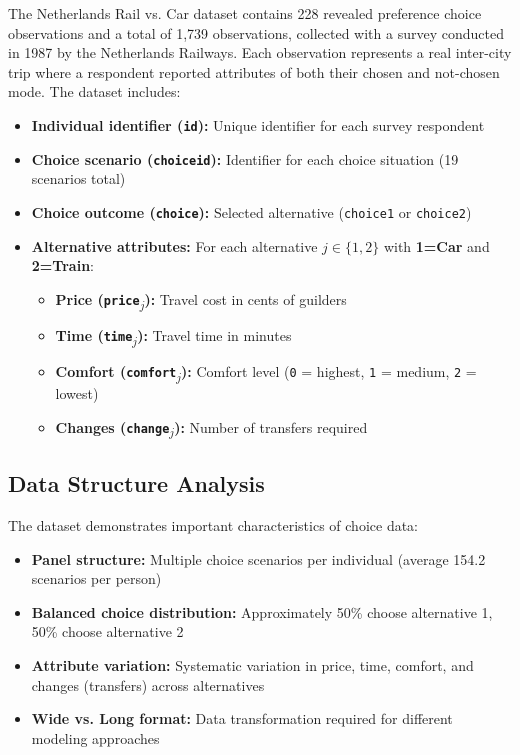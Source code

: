 \documentclass[11pt]{article}
\begin{document}
The Netherlands Rail vs. Car dataset contains 228 revealed preference choice observations and a total of 1,739 observations, collected with a survey conducted in 1987 by the Netherlands Railways. Each observation represents a real inter-city trip where a respondent reported attributes of both their chosen and not-chosen mode. The dataset includes:

\begin{itemize}
\item \textbf{Individual identifier (\texttt{id}):} Unique identifier for each survey respondent
\item \textbf{Choice scenario (\texttt{choiceid}):} Identifier for each choice situation (19 scenarios total)
\item \textbf{Choice outcome (\texttt{choice}):} Selected alternative (\texttt{choice1} or \texttt{choice2})
\item \textbf{Alternative attributes:} For each alternative $j \in \{1,2\}$ with \textbf{1=Car} and \textbf{2=Train}:
\begin{itemize}
\item \textbf{Price (\texttt{price}\textsubscript{$j$}):} Travel cost in cents of guilders
\item \textbf{Time (\texttt{time}\textsubscript{$j$}):} Travel time in minutes
\item \textbf{Comfort (\texttt{comfort}\textsubscript{$j$}):} Comfort level (\texttt{0} = highest, \texttt{1} = medium, \texttt{2} = lowest)
\item \textbf{Changes (\texttt{change}\textsubscript{$j$}):} Number of transfers required
\end{itemize}
\end{itemize}

\newpage
\subsection*{Data Structure Analysis}

The dataset demonstrates important characteristics of choice data:
\begin{itemize}
\item \textbf{Panel structure:} Multiple choice scenarios per individual (average 154.2 scenarios per person)
\item \textbf{Balanced choice distribution:} Approximately 50\% choose alternative 1, 50\% choose alternative 2
\item \textbf{Attribute variation:} Systematic variation in price, time, comfort, and changes (transfers) across alternatives
\item \textbf{Wide vs. Long format:} Data transformation required for different modeling approaches
\end{itemize}
\end{document}
